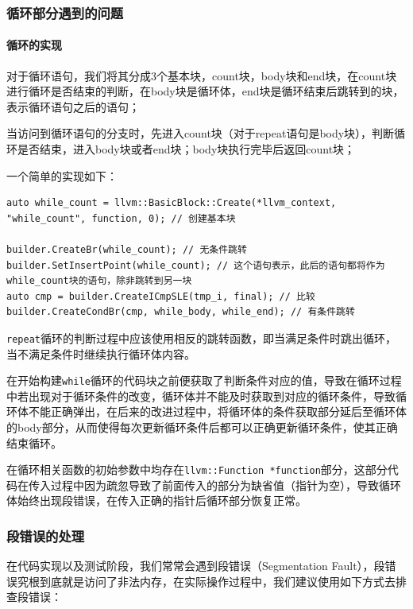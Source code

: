 \documentclass[lang=cn,11pt,a4paper,cite=authornum]{paper}
\begin{document}
\subsubsection{循环部分遇到的问题}

\paragraph{循环的实现}

对于循环语句，我们将其分成3个基本块，count块，body块和end块，在count块进行循环是否结束的判断，在body块是循环体，end块是循环结束后跳转到的块，表示循环语句之后的语句；

当访问到循环语句的分支时，先进入count块（对于repeat语句是body块），判断循环是否结束，进入body块或者end块；body块执行完毕后返回count块；

一个简单的实现如下：

\begin{code}
\begin{verbatim}
auto while_count = llvm::BasicBlock::Create(*llvm_context, "while_count", function, 0); // 创建基本块

builder.CreateBr(while_count); // 无条件跳转
builder.SetInsertPoint(while_count); // 这个语句表示，此后的语句都将作为while_count块的语句，除非跳转到另一块
auto cmp = builder.CreateICmpSLE(tmp_i, final); // 比较
builder.CreateCondBr(cmp, while_body, while_end); // 有条件跳转
\end{verbatim}
\end{code}

\texttt{repeat}循环的判断过程中应该使用相反的跳转函数，即当满足条件时跳出循环，当不满足条件时继续执行循环体内容。

在开始构建\texttt{while}循环的代码块之前便获取了判断条件对应的值，导致在循环过程中若出现对于循环条件的改变，循环体并不能及时获取到对应的循环条件，导致循环体不能正确弹出，在后来的改进过程中，将循环体的条件获取部分延后至循环体的body部分，从而使得每次更新循环条件后都可以正确更新循环条件，使其正确结束循环。

在循环相关函数的初始参数中均存在\texttt{llvm::Function *function}部分，这部分代码在传入过程中因为疏忽导致了前面传入的部分为缺省值（指针为空），导致循环体始终出现段错误，在传入正确的指针后循环部分恢复正常。

\subsubsection{段错误的处理}

在代码实现以及测试阶段，我们常常会遇到段错误（Segmentation Fault），段错误究根到底就是访问了非法内存，在实际操作过程中，我们建议使用如下方式去排查段错误：
\end{document}
